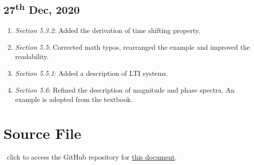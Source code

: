 \subsection*{27\textsuperscript{th} Dec, 2020}
\begin{enumerate}
    \item \emph{Section 5.3.2}: Added the derivation of time shifting property.
    \item \emph{Section 5.5}: Corrected math typos, rearranged the example and improved the readability.
    \item \emph{Section 5.5.1}: Added a description of LTI systems.
    \item \emph{Section 5.6}: Refined the description of magnitude and phase spectra. An example is adopted from the textbook.
\end{enumerate}


\section*{Source File}
\faGithub \ click to access the GitHub repository for \href{https://github.com/binghuan-li/Notes-and-Formula-Sheets}{this document}.